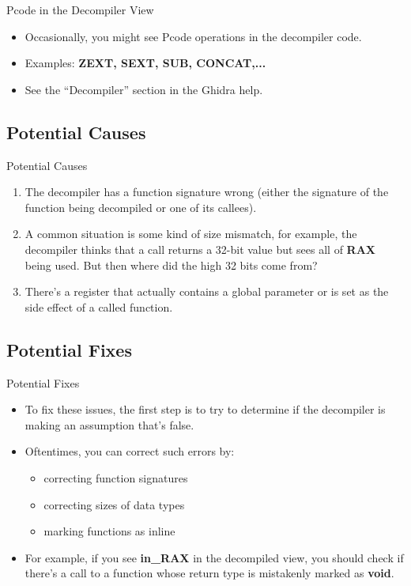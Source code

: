 \documentclass{beamer}
\begin{document}
\begin{frame}
\begin{block}{Pcode in the Decompiler View}
\begin{itemize}
\item Occasionally, you might see Pcode operations in the decompiler code.
\item Examples: \textbf{ZEXT, SEXT, SUB, CONCAT,...}
\item See the ``Decompiler'' section in the Ghidra help.
\end{itemize}
\end{block}
\end{frame}

\subsection{Potential Causes}
\begin{frame}
\begin{block}{Potential Causes}
\begin{enumerate}
\item The decompiler has a function signature wrong (either the signature of the function being decompiled or one of its callees).
\item A common situation is some kind of size mismatch, for example, the decompiler thinks that a call returns a 32-bit value but sees all of \textbf{RAX} being used.
But then where did the high 32 bits come from?
\item There's a register that actually contains a global parameter or is set as the side effect of a called function.
\end{enumerate}
\end{block}
\end{frame}

\subsection{Potential Fixes}
\begin{frame}
\begin{block}{Potential Fixes}
\begin{itemize}
\item To fix these issues, the first step is to try to determine if the decompiler is making an assumption that's false.
\item Oftentimes, you can correct such errors by:
\begin{itemize}
\item correcting function signatures
\item correcting sizes of data types
\item marking functions as inline
\end{itemize}
\item For example, if you see \textbf{in\_RAX} in the decompiled view, you should check if there's a call to a function whose return type is mistakenly marked as \textbf{void}.
\end{itemize}
\end{block}
\end{frame}
\end{document}
